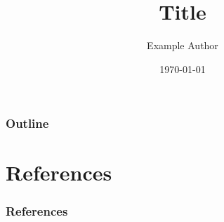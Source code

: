 \documentclass{beamer}
\title{Title}
\author{Example Author}
\institute{Example University}
\date{\today}
\begin{document}
\frame{\titlepage}

\begin{frame}
    \frametitle{Outline}
    \tableofcontents
\end{frame}

\section{References}

\begin{frame}[allowframebreaks]
    \frametitle{References}
    \printbibliography
\end{frame}
\end{document}

